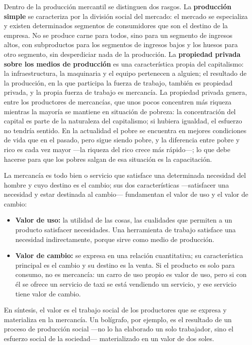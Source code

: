 \documentclass[
  man,
  floatsintext,
  longtable,
  a4paper,
  nolmodern,
  notxfonts,
  notimes,
  12pt,
  colorlinks=true,linkcolor=blue,citecolor=blue,urlcolor=blue]{apa7}
\providecommand{\tightlist}{%
  \setlength{\itemsep}{0pt}\setlength{\parskip}{0pt}}
\begin{document}
Dentro de la producción mercantil se distinguen dos rasgos. La
\textbf{producción simple} se caracteriza por la división social del
mercado: el mercado se especializa y existen determinados segmentos de
consumidores que son el destino de la empresa. No se produce carne para
todos, sino para un segmento de ingresos altos, con subproductos para
los segmentos de ingresos bajos y los huesos para otro segmento, sin
desperdiciar nada de la producción. La \textbf{propiedad privada sobre
los medios de producción} es una característica propia del capitalismo:
la infraestructura, la maquinaria y el equipo pertenecen a alguien; el
resultado de la producción, en la que participa la fuerza de trabajo,
también es propiedad privada, y la propia fuerza de trabajo es
mercancía. La propiedad privada genera, entre los productores de
mercancías, que unos pocos concentren más riqueza mientras la mayoría se
mantiene en situación de pobreza: la concentración del capital es parte
de la naturaleza del capitalismo; si hubiera igualdad, el esfuerzo no
tendría sentido. En la actualidad el pobre se encuentra en mejores
condiciones de vida que en el pasado, pero sigue siendo pobre, y la
diferencia entre pobre y rico es cada vez mayor ---la riqueza del rico
crece más rápido---; lo que debe hacerse para que los pobres salgan de
esa situación es la capacitación.

La mercancía es todo bien o servicio que satisface una determinada
necesidad del hombre y cuyo destino es el cambio; sus dos
características ---satisfacer una necesidad y estar destinada al
cambio--- fundamentan el valor de uso y el valor de cambio:

\begin{itemize}
\tightlist
\item
  \textbf{Valor de uso:} la utilidad de las cosas, las cualidades que
  permiten a un producto satisfacer necesidades. Una herramienta de
  trabajo satisface una necesidad indirectamente, porque sirve como
  medio de producción.
\item
  \textbf{Valor de cambio:} se expresa en una relación cuantitativa; su
  característica principal es el cambio y su destino es la venta. Si el
  producto es solo para consumo, no es mercancía: un carro de uso propio
  es valor de uso, pero si con él se ofrece un servicio de taxi se está
  vendiendo un servicio, y ese servicio tiene valor de cambio.
\end{itemize}

En síntesis, el valor es el trabajo social de los productores que se
expresa y materializa en la mercancía. Un bolígrafo, por ejemplo, es el
resultado de un proceso de producción social ---no lo ha elaborado un
solo trabajador, sino el esfuerzo social de la sociedad--- materializado
en un valor de dos soles.
\end{document}
